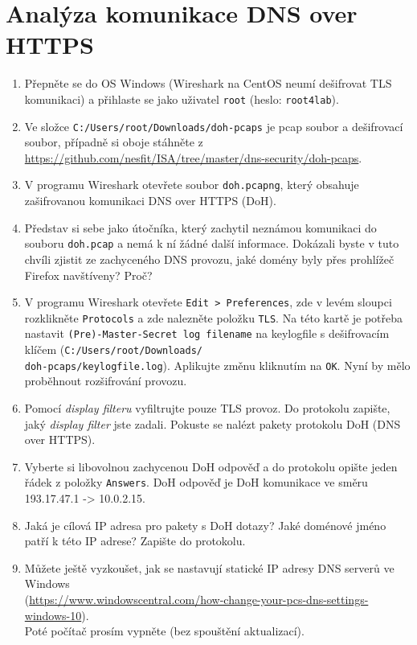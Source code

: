\section{Analýza komunikace DNS over HTTPS}
\begin{enumerate}
    \item Přepněte se do OS Windows (Wireshark na CentOS neumí dešifrovat TLS komunikaci) a přihlaste se jako uživatel \texttt{root} (heslo: \texttt{root4lab}).
    \item Ve složce \texttt{C:/Users/root/Downloads/doh-pcaps} je pcap soubor a dešifrovací soubor, případně si oboje stáhněte z \url{https://github.com/nesfit/ISA/tree/master/dns-security/doh-pcaps}.
    \item V programu Wireshark otevřete soubor \texttt{doh.pcapng}, který obsahuje zašifrovanou komunikaci DNS over HTTPS (DoH).
    \item Představ si sebe jako útočníka, který zachytil neznámou komunikaci do souboru \texttt{doh.pcap} a nemá k ní žádné další informace. Dokázali byste v tuto chvíli zjistit ze zachyceného DNS provozu, jaké domény byly přes prohlížeč Firefox navštíveny? Proč?
    \item V programu Wireshark otevřete \texttt{Edit > Preferences}, zde v levém sloupci rozklikněte \texttt{Protocols} a zde nalezněte položku \texttt{TLS}. Na této kartě je potřeba nastavit \texttt{(Pre)-Master-Secret log filename} na keylogfile s dešifrovacím klíčem (\texttt{C:/Users/root/Downloads/\\doh-pcaps/keylogfile.log}). Aplikujte změnu kliknutím na \texttt{OK}. Nyní by mělo proběhnout rozšifrování provozu.
    \item Pomocí \emph{display filteru} vyfiltrujte pouze TLS provoz. Do protokolu zapište, jaký \emph{display filter} jste zadali. Pokuste se nalézt pakety protokolu DoH (DNS over HTTPS).
    \item Vyberte si libovolnou zachycenou DoH odpověď a do protokolu opište jeden řádek z položky \texttt{Answers}. DoH odpověď je DoH komunikace ve směru 193.17.47.1 -> 10.0.2.15.
	\item Jaká je cílová IP adresa pro pakety s DoH dotazy? Jaké doménové jméno patří k této IP adrese? Zapište do protokolu.
    \item Můžete ještě vyzkoušet, jak se nastavují statické IP adresy DNS serverů ve Windows\\ (\url{https://www.windowscentral.com/how-change-your-pcs-dns-settings-windows-10}).\\ Poté počítač prosím vypněte (bez spouštění aktualizací).
\end{enumerate}
